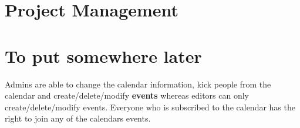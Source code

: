 \documentclass[10pt,a4paper]{article}
\begin{document}
\section{Project Management}
     
\newpage
\newpage
\section{To put somewhere later}
Admins are able to change the calendar information, kick people from the calendar and create/delete/modify \textbf{events} whereas editors can only create/delete/modify events. Everyone who is subscribed to the calendar has the right to join any of the calendars events.
\end{document}
